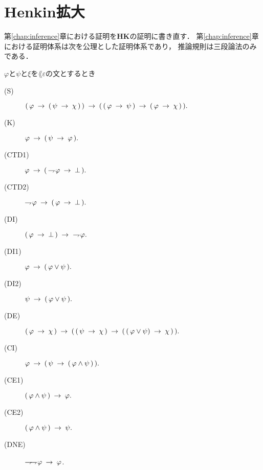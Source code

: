\section{Henkin拡大}
	第\ref{chap:inference}章における証明を{\bf HK}の証明に書き直す．
	第\ref{chap:inference}章における証明体系は次を公理とした証明体系であり，
	推論規則は三段論法のみである．
	
	\begin{screen}
		\begin{logicalaxm}
			$\varphi$と$\psi$と$\xi$を$\lang{\varepsilon}$の文とするとき
			\begin{description}
				\item[(S)] $(\, \varphi \rarrow (\, \psi \rarrow \chi\, )\, ) 
					\rarrow (\, (\, \varphi \rarrow \psi\, )
					\rarrow (\, \varphi \rarrow \chi\, )\, ).$
				\item[(K)] $\varphi \rarrow (\, \psi \rarrow \varphi\, ).$
				\item[(CTD1)] $\varphi \rarrow (\, \negation \varphi \rarrow \bot\, ).$
				\item[(CTD2)] $\negation \varphi \rarrow (\, \varphi \rarrow \bot\, ).$
				\item[(DI)] $(\, \varphi \rarrow \bot\, ) \rarrow\ \negation \varphi.$
				\item[(DI1)] $\varphi \rarrow (\, \varphi \vee \psi\, ).$
				\item[(DI2)] $\psi \rarrow (\, \varphi \vee \psi\, ).$
				\item[(DE)] $(\, \varphi \rarrow \chi\, ) \rarrow 
					(\, (\, \psi \rarrow \chi\, ) 
					\rarrow (\, (\, \varphi \vee \psi) \rarrow \chi\, )\, ).$
				\item[(CI)] $\varphi \rarrow (\, \psi \rarrow (\, \varphi \wedge \psi\, )\, ).$
				\item[(CE1)] $(\, \varphi \wedge \psi\, ) \rarrow \varphi.$
				\item[(CE2)] $(\, \varphi \wedge \psi\, ) \rarrow \psi.$
				\item[(DNE)] $\negation \negation \varphi \rarrow \varphi$.
			\end{description}
		\end{logicalaxm}
	\end{screen}
	
